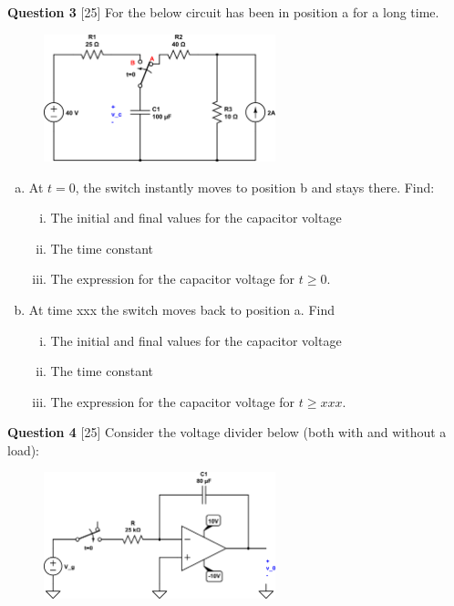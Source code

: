 \documentclass[12pt]{article}
\begin{document}
\newpage
{\bf Question 3} [25] 
\newline
For the below circuit has been in position a for a long time. 

\begin{figure}[h!]
     \centering
       \includegraphics[clip,width=0.6\textwidth]{mid4_3.png}
\end{figure}

\begin{enumerate}[(a)]
\item At $t=0$, the switch instantly moves to position b and stays there. Find:
\begin{enumerate}[(i)]
\item The initial and final values for the capacitor voltage
\item The time constant
\item The expression for the capacitor voltage for $t \geq 0$.
\end{enumerate}
\item At time xxx the switch moves back to position a. Find
\begin{enumerate}[(i)]
\item The initial and final values for the capacitor voltage
\item The time constant
\item The expression for the capacitor voltage for $t \geq xxx$.
\end{enumerate}

\end{enumerate}

\newpage
{\bf Question 4} [25] 
\newline
Consider the voltage divider below (both with and without a load):

\begin{figure}[!h]
  \centering 
  \includegraphics[clip,width=0.6\textwidth]{mid2_4.png}
\end{figure}
\end{document}
